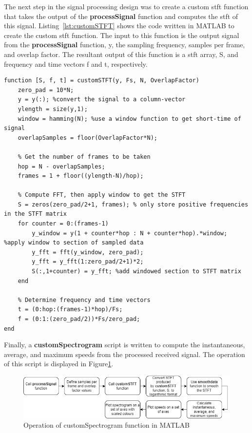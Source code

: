 \documentclass[class=report,11pt,crop=false]{standalone}
\begin{document}
The next step in the signal processing design was to create a custom \gls{stft} function that takes the output of the \textbf{processSignal} function and computes the \gls{stft} of this signal. Listing~\ref{lst:customSTFT} shows the code written in \textsc{MATLAB} to create the custom \gls{stft} function. The input to this function is the output signal from the \textbf{processSignal} function, y, the sampling frequency, samples per frame, and overlap factor. The resultant output of this function is a \gls{stft} array, S, and frequency and time vectors f and t, respectively.

\begin{lstlisting}[caption=\textsc{MATLAB} code to create a custom \gls{STFT} function.]
function [S, f, t] = customSTFT(y, Fs, N, OverlapFactor)
    zero_pad = 10*N;
    y = y(:); %convert the signal to a column-vector
    ylength = size(y,1);
    window = hamming(N); %use a window function to get short-time of signal
    overlapSamples = floor(OverlapFactor*N);

    % Get the number of frames to be taken
    hop = N - overlapSamples;
    frames = 1 + floor((ylength-N)/hop);

    % Compute FFT, then apply window to get the STFT
    S = zeros(zero_pad/2+1, frames); % only store positive frequencies in the STFT matrix
    for counter = 0:(frames-1)
        y_window = y(1 + counter*hop : N + counter*hop).*window; %apply window to section of sampled data
        y_fft = fft(y_window, zero_pad);
        y_fft = y_fft(1:zero_pad/2+1)*2;
        S(:,1+counter) = y_fft; %add windowed section to STFT matrix
    end
    
    % Determine frequency and time vectors
    t = (0:hop:(frames-1)*hop)/Fs; 
    f = (0:1:(zero_pad/2))*Fs/zero_pad;
end 
\end{lstlisting}\label{lst:customSTFT}

Finally, a \textbf{customSpectrogram} script is written to compute the instantaneous, average, and maximum speeds from the processed received signal. The operation of this script is displayed in Figure\ref{fig:custom-spectrogram}.

\begin{figure}[htbp]
    \centering
    \includegraphics[width=1\columnwidth]{../Images/custom_spectrogram.drawio.png}
    \caption{Operation of customSpectrogram function in \textsc{MATLAB}}
    \label{fig:custom-spectrogram}
\end{figure}
\end{document}
